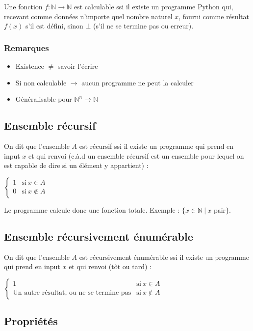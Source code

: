 Une fonction $f : \mathbb{N} \rightarrow \mathbb{N}$ est calculable ssi il existe un programme Python qui, recevant comme données n'importe quel nombre naturel $x$, fourni comme résultat $f(x)$ s'il est défini, sinon $\bot$ (s'il ne se termine pas ou erreur).

\subsubsection{Remarques}

\begin{itemize}
\item Existence $\neq$ savoir l'écrire
\item Si non calculable $\rightarrow$ aucun programme ne peut la calculer
\item Généralisable pour $\mathbb{N}^n \rightarrow \mathbb{N}$
\end{itemize}

\subsection{Ensemble récursif}

On dit que l'ensemble $A$ est récursif ssi il existe un programme qui prend en input $x$ et qui renvoi (c.à.d un ensemble récursif est un ensemble pour lequel on est capable de dire si un élément y appartient) :

$\begin{cases}
	1 & \text{si}\ x \in A\\
	0 & \text{si}\ x \notin A
\end{cases}$

Le programme calcule donc une fonction totale. Exemple : $\{x \in \mathbb{N} \ | \ x \text{ pair}\}$.

\subsection{Ensemble récursivement énumérable}

On dit que l'ensemble $A$ est récursivement énumérable ssi il existe un programme qui prend en input $x$ et qui renvoi (tôt ou tard) :

$\begin{cases}
	1 & \text{si}\ x \in A\\
	\text{Un autre résultat, ou ne se termine pas}& \text{si}\ x \notin A
\end{cases}$

\subsection{Propriétés}

